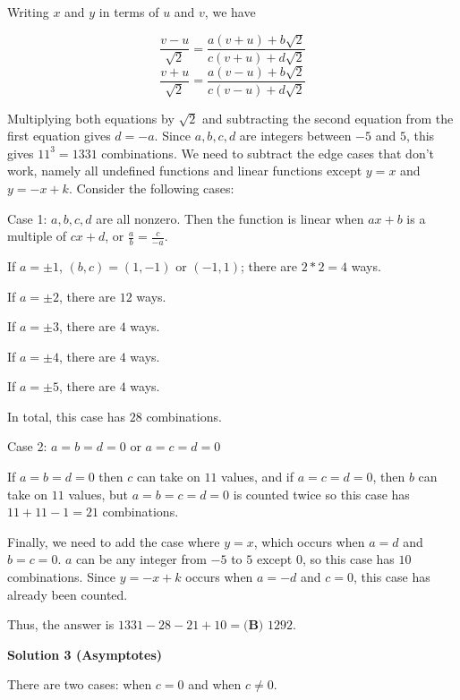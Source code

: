 \begin{enumerate}
 Writing $x$ and $y$ in terms of $u$ and $v$, we have

 
 \[\frac{v - u}{\sqrt{2}} = \frac{a(v + u) + b\sqrt{2}}{c(v + u) + d\sqrt{2}}\]
 \[\frac{v + u}{\sqrt{2}} = \frac{a(v - u) + b\sqrt{2}}{c(v - u) + d\sqrt{2}}\]

 Multiplying both equations by $\sqrt{2}$ and subtracting the second equation from the first equation gives $d = -a$. Since $a, b, c, d$ are integers between $-5$ and $5$, this gives $11^3 = 1331$ combinations. We need to subtract the edge cases that don't work, namely all undefined functions and linear functions except $y = x$ and $y = -x+k$. Consider the following cases:

 


 Case 1: $a, b, c, d$ are all nonzero. Then the function is linear when $ax + b$ is a multiple of $cx + d$, or $\frac{a}{b} = \frac{c}{-a}$. 

 If $a = \pm 1$, $(b,c) = (1, -1)$ or $(-1, 1)$; there are $2*2 = 4$ ways.

 If $a = \pm 2$, there are $12$ ways.

 If $a = \pm 3$, there are $4$ ways.

 If $a = \pm 4$, there are $4$ ways.

 If $a = \pm 5$, there are $4$ ways.

 In total, this case has $28$ combinations.

 


 Case 2: $a = b = d = 0$ or $a = c = d = 0$

 If $a = b = d = 0$ then $c$ can take on $11$ values, and if $a = c = d = 0$, then $b$ can take on $11$ values, but $a = b = c = d = 0$ is counted twice so this case has $11 + 11 - 1 = 21$ combinations.

 


 Finally, we need to add the case where $y = x$, which occurs when $a = d$ and $b = c = 0$. $a$ can be any integer from $-5$ to $5$ except $0$, so this case has $10$ combinations. Since $y = -x+k$ occurs when $a = -d$ and $c = 0$, this case has already been counted.

 


 Thus, the answer is $1331 - 28 - 21 + 10 = \boxed{\textbf{(B) }1292}$.

 



\textbf{Solution 3 (Asymptotes)}

There are two cases: when $c=0$ and when $c\neq 0$.

 



\end{enumerate}
